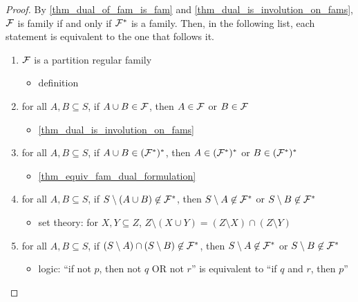 \begin{proof}
    By \cref{thm_dual_of_fam_is_fam} and \cref{thm_dual_is_involution_on_fams}, $\mathcal{F}$ is family if and only if $\mathcal{F}^*$ is a family.  Then, in the following list, each statement is equivalent to the one that follows it.
    \begin{enumerate}
        \item $\mathcal{F}$ is a partition regular family
        \begin{itemize}
            \item[--] definition
        \end{itemize}

        \item for all $A, B \subseteq S$, if $A \cup B \in \mathcal{F}$, then $A \in \mathcal{F}$ or $B \in \mathcal{F}$
        \begin{itemize}
            \item[--] \cref{thm_dual_is_involution_on_fams}
        \end{itemize}

        \item for all $A, B \subseteq S$, if $A \cup B \in (\mathcal{F}^*)^*$, then $A \in (\mathcal{F}^*)^*$ or $B \in (\mathcal{F}^*)^*$
        \begin{itemize}
            \item[--] \cref{thm_equiv_fam_dual_formulation}
        \end{itemize}

        \item for all $A, B \subseteq S$, if $S \setminus (A \cup B) \not\in \mathcal{F}^*$, then $S \setminus A \not\in \mathcal{F}^*$ or $S \setminus B \not\in \mathcal{F}^*$
        \begin{itemize}
            \item[--] set theory: for $X, Y \subseteq Z$, $Z \setminus (X \cup Y) = (Z \setminus X) \cap (Z \setminus Y)$
        \end{itemize}

        \item for all $A, B \subseteq S$, if $(S \setminus A) \cap (S \setminus B) \not\in \mathcal{F}^*$, then $S \setminus A \not\in \mathcal{F}^*$ or $S \setminus B \not\in \mathcal{F}^*$
        \begin{itemize}
            \item[--] logic: ``if not $p$, then not $q$ OR not $r$'' is equivalent to ``if $q$ and $r$, then $p$''
        \end{itemize}


\end{enumerate}
\end{proof}
